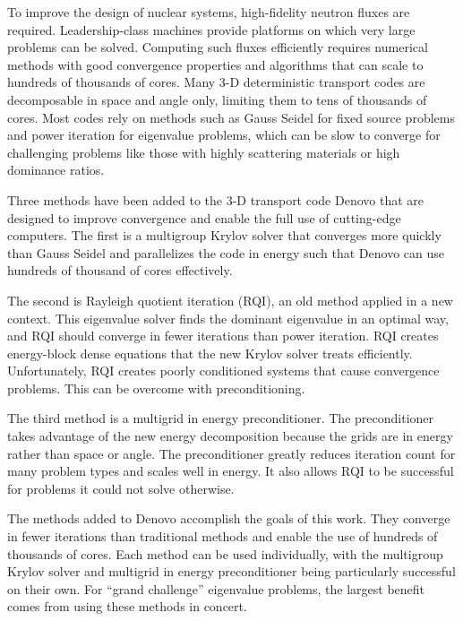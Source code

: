 
\noindent       %
To improve the design of nuclear systems, high-fidelity neutron fluxes are required. Leadership-class machines provide platforms on which very large problems can be solved. Computing such fluxes efficiently requires numerical methods with good convergence properties and algorithms that can scale to hundreds of thousands of cores. Many 3-D deterministic transport codes are decomposable in space and angle only, limiting them to tens of thousands of cores. Most codes rely on methods such as Gauss Seidel for fixed source problems and power iteration for eigenvalue problems, which can be slow to converge for challenging problems like those with highly scattering materials or high dominance ratios. 

\vspace*{0.5em}
\noindent       %
Three methods have been added to the 3-D \Sn transport code Denovo that are designed to improve convergence and enable the full use of cutting-edge computers. The first is a multigroup Krylov solver that converges more quickly than Gauss Seidel and parallelizes the code in energy such that Denovo can use hundreds of thousand of cores effectively. 

\vspace*{0.5em}
\noindent       %
The second is Rayleigh quotient iteration (RQI), an old method applied in a new context. This eigenvalue solver finds the dominant eigenvalue in an optimal way, and RQI should converge in fewer iterations than power iteration. RQI creates energy-block dense equations that the new Krylov solver treats efficiently. Unfortunately, RQI creates poorly conditioned systems that cause convergence problems. This can be overcome with preconditioning. 

\vspace*{0.5em}
\noindent       %
The third method is a multigrid in energy preconditioner. The preconditioner takes advantage of the new energy decomposition because the grids are in energy rather than space or angle. The preconditioner greatly reduces iteration count for many problem types and scales well in energy. It also allows RQI to be successful for problems it could not solve otherwise. 

\vspace*{0.5em}
\noindent       %
The methods added to Denovo accomplish the goals of this work. They converge in fewer iterations than traditional methods and enable the use of hundreds of thousands of cores. Each method can be used individually, with the multigroup Krylov solver and multigrid in energy preconditioner being particularly successful on their own. For ``grand challenge'' eigenvalue problems, the largest benefit comes from using these methods in concert. 
